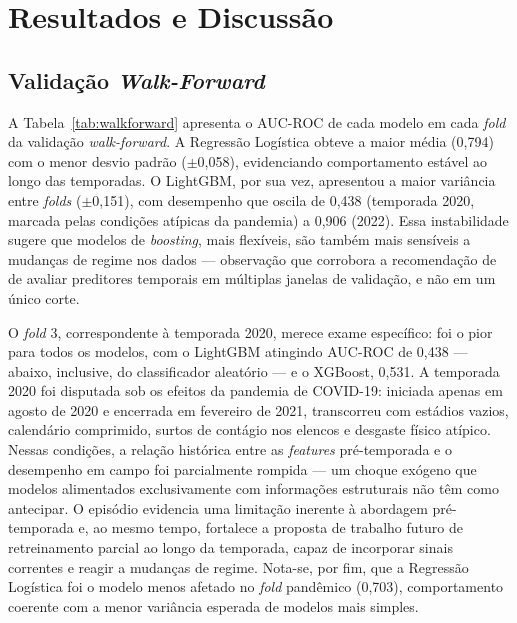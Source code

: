 \documentclass[
    article,
    12pt,
    oneside,
    a4paper,
    english,
    brazilian
    ]{abntex2}
\begin{document}
\section{Resultados e Discussão}

\subsection{Validação \textit{Walk-Forward}}

A Tabela~\ref{tab:walkforward} apresenta o AUC-ROC de cada modelo em cada \textit{fold} da validação \textit{walk-forward}. A Regressão Logística obteve a maior média (0,794) com o menor desvio padrão ($\pm$0,058), evidenciando comportamento estável ao longo das temporadas. O LightGBM, por sua vez, apresentou a maior variância entre \textit{folds} ($\pm$0,151), com desempenho que oscila de 0,438 (temporada 2020, marcada pelas condições atípicas da pandemia) a 0,906 (2022). Essa instabilidade sugere que modelos de \textit{boosting}, mais flexíveis, são também mais sensíveis a mudanças de regime nos dados --- observação que corrobora a recomendação de  de avaliar preditores temporais em múltiplas janelas de validação, e não em um único corte.



O \textit{fold} 3, correspondente à temporada 2020, merece exame específico: foi o pior para todos os modelos, com o LightGBM atingindo AUC-ROC de 0,438 --- abaixo, inclusive, do classificador aleatório --- e o XGBoost, 0,531. A temporada 2020 foi disputada sob os efeitos da pandemia de COVID-19: iniciada apenas em agosto de 2020 e encerrada em fevereiro de 2021, transcorreu com estádios vazios, calendário comprimido, surtos de contágio nos elencos e desgaste físico atípico. Nessas condições, a relação histórica entre as \textit{features} pré-temporada e o desempenho em campo foi parcialmente rompida --- um choque exógeno que modelos alimentados exclusivamente com informações estruturais não têm como antecipar. O episódio evidencia uma limitação inerente à abordagem pré-temporada e, ao mesmo tempo, fortalece a proposta de trabalho futuro de retreinamento parcial ao longo da temporada, capaz de incorporar sinais correntes e reagir a mudanças de regime. Nota-se, por fim, que a Regressão Logística foi o modelo menos afetado no \textit{fold} pandêmico (0,703), comportamento coerente com a menor variância esperada de modelos mais simples.
\end{document}
